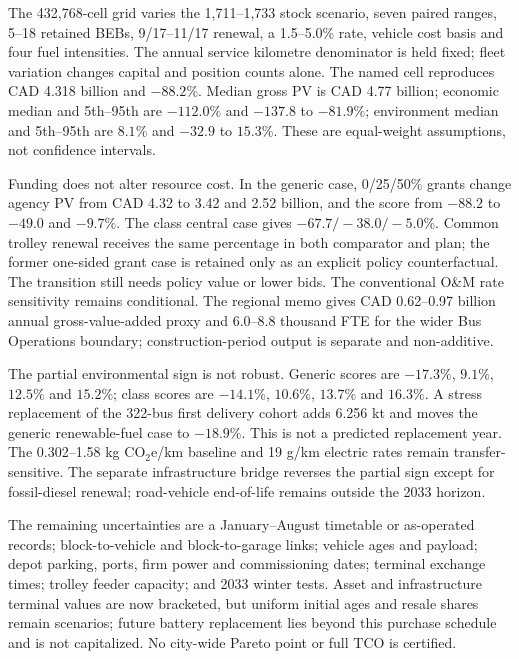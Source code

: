 \documentclass[12pt,letterpaper]{article}
\begin{document}
The 432,768-cell grid varies the 1,711--1,733 stock scenario, seven paired ranges, 5--18 retained BEBs, 9/17--11/17 renewal, a 1.5--5.0\% rate, vehicle cost basis and four fuel intensities. The annual service kilometre denominator is held fixed; fleet variation changes capital and position counts alone. The named cell reproduces CAD 4.318 billion and $-88.2\%$. Median gross PV is CAD 4.77 billion; economic median and 5th--95th are $-112.0\%$ and $-137.8$ to $-81.9\%$; environment median and 5th--95th are $8.1\%$ and $-32.9$ to $15.3\%$. These are equal-weight assumptions, not confidence intervals.

Funding does not alter resource cost. In the generic case, 0/25/50\% grants change agency PV from CAD 4.32 to 3.42 and 2.52 billion, and the score from $-88.2$ to $-49.0$ and $-9.7\%$. The class central case gives $-67.7/-38.0/-5.0\%$. Common trolley renewal receives the same percentage in both comparator and plan; the former one-sided grant case is retained only as an explicit policy counterfactual. The transition still needs policy value or lower bids. The conventional O\&M rate sensitivity remains conditional. The regional memo gives CAD 0.62--0.97 billion annual gross-value-added proxy and 6.0--8.8 thousand FTE for the wider Bus Operations boundary; construction-period output is separate and non-additive.\cite{budget2025,statcan2022io,tc2024comp}

The partial environmental sign is not robust. Generic scores are $-17.3\%$, $9.1\%$, $12.5\%$ and $15.2\%$; class scores are $-14.1\%$, $10.6\%$, $13.7\%$ and $16.3\%$. A stress replacement of the 322-bus first delivery cohort adds 6.256 kt and moves the generic renewable-fuel case to $-18.9\%$. This is not a predicted replacement year. The 0.302--1.58 kg CO$_2$e/km baseline and 19 g/km electric rates remain transfer-sensitive. The separate infrastructure bridge reverses the partial sign except for fossil-diesel renewal; road-vehicle end-of-life remains outside the 2033 horizon.

The remaining uncertainties are a January--August timetable or as-operated records; block-to-vehicle and block-to-garage links; vehicle ages and payload; depot parking, ports, firm power and commissioning dates; terminal exchange times; trolley feeder capacity; and 2033 winter tests. Asset and infrastructure terminal values are now bracketed, but uniform initial ages and resale shares remain scenarios; future battery replacement lies beyond this purchase schedule and is not capitalized. No city-wide Pareto point or full TCO is certified.
\end{document}
